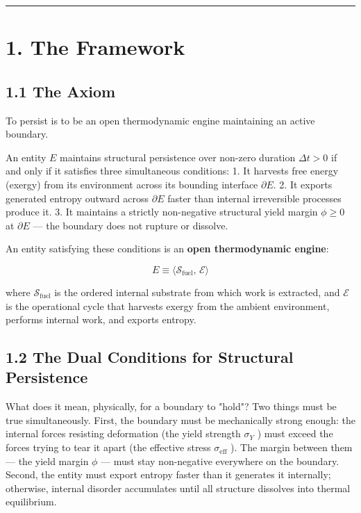 \documentclass[11pt,a4paper]{article}
\theoremstyle{definition}\newtheorem{definition}{Definition}
\theoremstyle{remark}\newtheorem{remark}{Remark}
\begin{document}
\noindent\rule{\linewidth}{0.4pt}
\section{1. The Framework}
\subsection{1.1 The Axiom}

To persist is to be an open thermodynamic engine maintaining an active boundary.

An entity $E$ maintains structural persistence over non-zero duration $\Delta t > 0$ if and only if it satisfies three simultaneous conditions:
1. It harvests free energy (exergy) from its environment across its bounding interface $\partial E$.
2. It exports generated entropy outward across $\partial E$ faster than internal irreversible processes produce it.
3. It maintains a strictly non-negative structural yield margin $\phi \ge 0$ at $\partial E$ — the boundary does not rupture or dissolve.

An entity satisfying these conditions is an \textbf{open thermodynamic engine}:


\begin{equation}
\boxed{E \equiv \langle \mathcal{S}_{\text{fuel}},\, \mathcal{E} \rangle}
\end{equation}


where $\mathcal{S}_{\text{fuel}}$ is the ordered internal substrate from which work is extracted, and $\mathcal{E}$ is the operational cycle that harvests exergy from the ambient environment, performs internal work, and exports entropy.
\subsection{1.2 The Dual Conditions for Structural Persistence}

What does it mean, physically, for a boundary to "hold"? Two things must be true simultaneously. First, the boundary must be mechanically strong enough: the internal forces resisting deformation (the yield strength $\sigma_Y$ ) must exceed the forces trying to tear it apart (the effective stress $\sigma_{\text{eff}}$ ). The margin between them — the yield margin $\phi$ — must stay non-negative everywhere on the boundary. Second, the entity must export entropy faster than it generates it internally; otherwise, internal disorder accumulates until all structure dissolves into thermal equilibrium.
\end{document}
